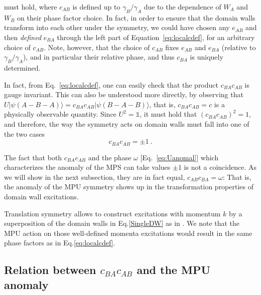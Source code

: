 \documentclass[aps,pra,export,nofootinbib]{revtex4-2}
\newcommand{\id}{\mathbb{1}}
\begin{document}
must hold, 
where $c_{AB}$ is defined up to $\gamma_B/\gamma_A$ due to the dependence of $W_A$ and $W_B$ on their phase factor choice. In fact, in order to ensure that the domain walls transform into each other under the symmetry, we could have chosen any $e_{AB}$ and then \emph{defined} $e_{BA}$ through the left part of Equation~\eqref{eq:localcdef}, for an arbitrary choice of $c_{AB}$. Note, however, that the choice of $c_{AB}$ fixes $e_{AB}$ and $e_{BA}$ (relative to $\gamma_B/\gamma_A$), and in particular their relative phase, and thus $c_{BA}$ is uniquely determined. 

In fact, from Eq.~\eqref{eq:localcdef}, one can easily check that the product $c_{BA}c_{AB}$ is gauge invariant. 
This can also be understood more directly, by observing that 
$U\lvert\psi(A\!-\!B\!-\!A) \rangle = c_{BA}c_{AB} \lvert\psi(B\!-\!A\!-\!B) \rangle$, that is,  $c_{BA}c_{AB}=c$ is a physically observable quantity.
Since $U^2=\id$, it must hold that $(c_{BA}c_{AB})^2=1$, and therefore, the way the symmetry acts on domain walls must fall into one of the two cases
\begin{equation}
    c_{BA}c_{AB}=\pm 1\ .
\end{equation}

The fact that both $c_{BA}c_{AB}$ and the phase $\omega$ 
[Eq.~\eqref{eq:Uanomal}]
which characterizes the anomaly of the MPS can take values $\pm1$ is not a
coincidence. As we will show in the next subsection, they are in fact equal,
$c_{AB}c_{BA}=\omega$: That is, the anomaly of the MPU symmetry shows up
in the transformation properties of domain wall excitations. 

Translation symmetry allows to construct  excitations with momentum $k$ by a superposition of the domain walls in Eq.\eqref{SingleDW} as in \cite{Haegeman12A}. We note that the MPU action on those well-defined momenta excitations would result in the same phase factors as in Eq.\eqref{eq:localcdef}.


\subsection{Relation between $c_{BA}c_{AB}$ and the MPU anomaly}
%
\end{document}
